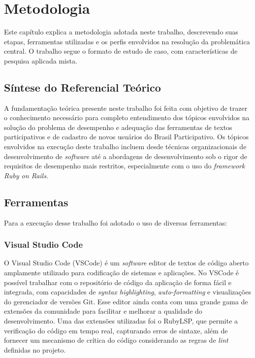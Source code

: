 \chapter {Metodologia}

Este capítulo explica a metodologia adotada neste trabalho, descrevendo suas etapas, ferramentas utilizadas e os perfis envolvidos na resolução da problemática central. O trabalho segue o formato de estudo de caso, com características de pesquisa aplicada mista.

\section {Síntese do Referencial Teórico}

A fundamentação teórica presente neste trabalho foi feita com objetivo de trazer o conhecimento necessário para completo entendimento dos tópicos envolvidos na solução do problema de desempenho e adequação das ferramentas de textos participativos e de cadastro de novos usuários do Brasil Participativo. Os tópicos envolvidos na execução deste trabalho incluem desde técnicas organizacionais de desenvolvimento de \textit{software} até a abordagens de desenvolvimento sob o rigor de requisitos de desempenho mais restritos, especialmente com o uso do \textit{framework Ruby on Rails}.

\section {Ferramentas}

Para a execução desse trabalho foi adotado o uso de diversas ferramentas:

\subsection {Visual Studio Code}

O Visual Studio Code (VSCode) é um \textit{software} editor de textos de código aberto amplamente utilizado para codificação de sistemas e aplicações. No VSCode é possível trabalhar com o repositório de código da aplicação de forma fácil e integrada, com capacidades de \textit{syntax highlighting}, \textit{auto-formatting} e visualizações do gerenciador de versões Git. Esse editor ainda conta com uma grande gama de extensões da comunidade para facilitar e melhorar a qualidade do desenvolvimento. Uma das extensões utilizadas foi o RubyLSP, que permite a verificação do código em tempo real, capturando erros de sintaxe, além de fornecer um mecanismo de crítica do código considerando as regras de \textit{lint} definidas no projeto.


